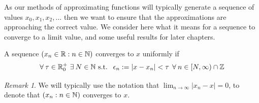 \theoremstyle{remark}
\newtheorem{Uniform Convergence R1}{Remark}[Uniform Convergence]

\theoremstyle{plain}
\newtheorem{Uniform Convergence Thm}{Theorem}[subsection]
\newtheorem{Quad Convergence of Newton}[Uniform Convergence Thm]{Theorem}

As our methods of approximating functions will typically generate a sequence of values \(x_0, x_1, x_2, \ldots\) then we want to ensure that the approximations are approaching the correct value. We consider here what it means for a sequence to converge to a limit value, and some useful results for later chapters.

\begin{Uniform Convergence}
\label{DEF_"Uniform Convergence"}
A sequence \((x_n \in \mathbb{R}: n \in \mathbb{N})\) converges to \(x\) uniformly if 
\begin{displaymath}
	\forall\: \tau \in \mathbb{R}^+_0\  \exists\: N \in \mathbb{N} \textrm{ s.t. }\  
		\epsilon_n := |x - x_n| < \tau\:\:\forall\: n \in [N, \infty)\cap\mathbb{Z}
\end{displaymath}
\end{Uniform Convergence}

\begin{Uniform Convergence R1}
\label{RMK_"Uniform Convergence R1"}
We will typically use the notation that \(\lim_{n \to \infty} |x_n - x| = 0\), to denote that \((x_n : n \in \mathbb{N})\) converges to \(x\).
\end{Uniform Convergence R1}

